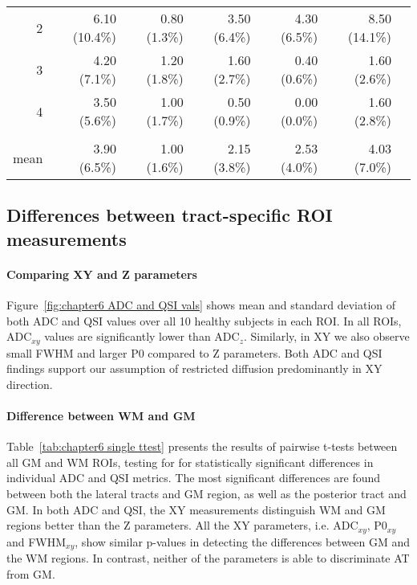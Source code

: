 \begin{table}
\begin{adjustbox}{width={0.75\textwidth},keepaspectratio}
\begin{minipage}{\linewidth}
{\begin{minipage}{\linewidth}
\begin{tabular}{rrrrrrr}
            2     & 6.10 (10.4\%) & 0.80 (1.3\%) & 3.50 (6.4\%) & 4.30 (6.5\%) & 8.50 (14.1\%) \\
            3     & 4.20 (7.1\%) & 1.20 (1.8\%) & 1.60 (2.7\%) & 0.40 (0.6\%) & 1.60 (2.6\%) \\
            4     & 3.50 (5.6\%) & 1.00 (1.7\%) & 0.50 (0.9\%) & 0.00 (0.0\%) & 1.60 (2.8\%) \\
                  &       &       &       &       &   & \\
            mean  & 3.90 (6.5\%) & 1.00 (1.6\%) & 2.15 (3.8\%) & 2.53 (4.0\%) & 4.03 (7.0\%) \\
            \bottomrule
            \end{tabular}%
			\end{minipage}
			\label{tab:chapter6 scan rescan qsi}
        }
		\end{minipage}
		\end{adjustbox}	
\label{tab:chapter6 scan rescan}
\end{table}
\subsection{Differences between tract-specific ROI measurements}
\label{par:chapter6 tract specific}
\paragraph{Comparing XY and Z parameters }
Figure~\ref{fig:chapter6 ADC and QSI vals} shows mean and standard deviation of both \gls{ADC} and \gls{QSI} values over all 10 healthy subjects in each \gls{ROI}. In all ROIs, ADC$_{xy}$ values are significantly lower than ADC$_{z}$. Similarly, in XY we also observe small FWHM and larger P0 compared to Z parameters. Both ADC and QSI findings support our assumption of restricted diffusion predominantly in XY direction.

\paragraph{Difference between WM and GM }
Table~\ref{tab:chapter6 single ttest} presents the results of pairwise t-tests between all GM and WM \glspl{ROI}, testing for for statistically significant differences in individual ADC and QSI metrics. The most significant differences are found between both the lateral tracts and GM region, as well as the posterior tract and GM. In both ADC and QSI, the XY measurements distinguish WM and GM regions better than the Z parameters. All the XY parameters, i.e. ADC$_{xy}$, P0$_{xy}$ and FWHM$_{xy}$, show similar p-values in detecting the differences between GM and the WM regions. In contrast, neither of the parameters is able to discriminate AT from GM.

